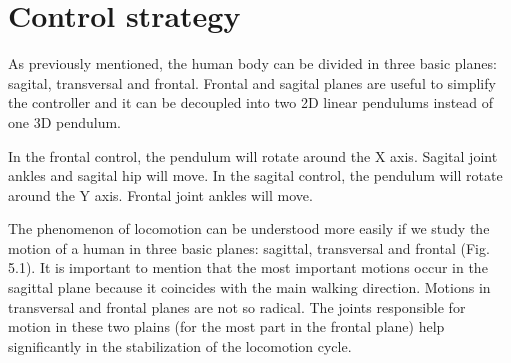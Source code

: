 \section{Control strategy}
As previously mentioned, the human body can be divided in three basic planes: sagital, transversal and frontal. Frontal and sagital planes are useful to simplify the controller and it can be decoupled into two 2D linear pendulums instead of one 3D pendulum.

In the frontal control, the pendulum will rotate around the X axis. Sagital joint ankles and sagital hip will move.
In the sagital control, the pendulum will rotate around the Y axis. Frontal joint ankles will move.
 


The phenomenon of locomotion can be understood more easily if we study the motion of a human in three basic planes: sagittal, transversal and frontal (Fig. 5.1). It is important to mention that the most important motions occur in the sagittal plane because it coincides with the main walking direction. Motions in transversal and frontal planes are not so radical. The joints responsible for motion in these two plains (for the most part in the frontal plane) help significantly in the stabilization of the locomotion cycle.
